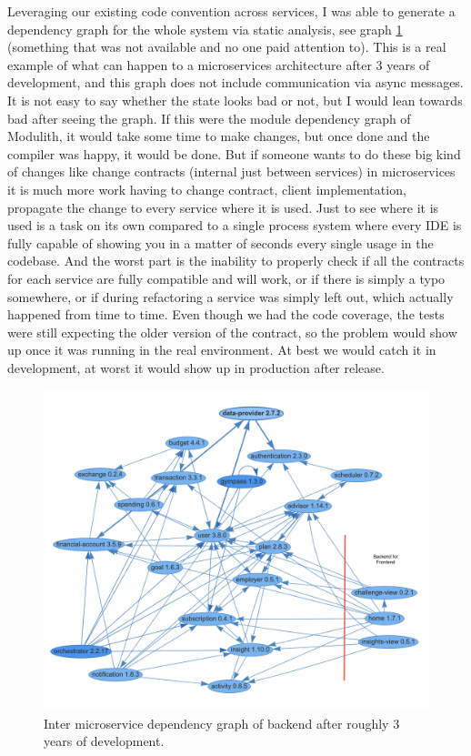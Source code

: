 Leveraging our existing code convention across services, I was able to generate a dependency graph for the whole system via static analysis, see graph \ref{img:microservices-current-commented} (something that was not available and no one paid attention to). This is a real example of what can happen to a microservices architecture after 3 years of development, and this graph does not include communication via async messages. It is not easy to say whether the state looks bad or not, but I would lean towards bad after seeing the graph. If this were the module dependency graph of Modulith, it would take some time to make changes, but once done and the compiler was happy, it would be done. But if someone wants to do these big kind of changes like change contracts (internal just between services) in microservices it is much more work having to change contract, client implementation, propagate the change to every service where it is used. Just to see where it is used is a task on its own compared to a single process system where every IDE is fully capable of showing you in a matter of seconds every single usage in the codebase. And the worst part is the inability to properly check if all the contracts for each service are fully compatible and will work, or if there is simply a typo somewhere, or if during refactoring a service was simply left out, which actually happened from time to time. Even though we had the code coverage, the tests were still expecting the older version of the contract, so the problem would show up once it was running in the real environment. At best we would catch it in development, at worst it would show up in production after release.

\begin{figure}
    \centering
    \includegraphics[width=\textwidth]{images/microservices-current-commented.png}
    \caption{Inter microservice dependency graph of backend after roughly 3 years of development. \label{img:microservices-current-commented}}
\end{figure}

